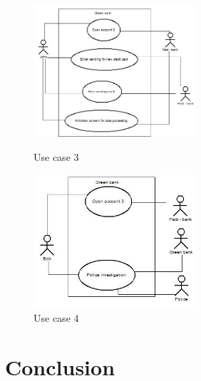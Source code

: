 \documentclass[11pt,english]{article}
\begin{document}
\begin{figure}[H]
\centering
\begin{minipage}{.5\textwidth}
  \centering
  \includegraphics[width=6cm,scale=0.5]{images/use case3.jpg}
  \caption{Use case 3}
  \label{fig:usecase3}
\end{minipage}%
\begin{minipage}{.5\textwidth}
  \centering
  \includegraphics[width=6cm,scale=0.5]{images/use case4.jpg}
  \caption{Use case 4}
  \label{fig:usecase4}
\end{minipage}
\end{figure}

\section{Conclusion}
\printbibliography
\end{document}
